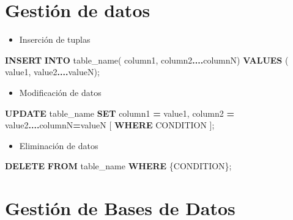 \documentclass[
]{book}
\newenvironment{Shaded}{\begin{snugshade}}{\end{snugshade}}
\newcommand{\KeywordTok}[1]{\textcolor[rgb]{0.13,0.29,0.53}{\textbf{#1}}}
\newcommand{\NormalTok}[1]{#1}
\newcommand{\OperatorTok}[1]{\textcolor[rgb]{0.81,0.36,0.00}{\textbf{#1}}}
\providecommand{\tightlist}{%
  \setlength{\itemsep}{0pt}\setlength{\parskip}{0pt}}
\begin{document}
\section{Gestión de datos}\label{gestiuxf3n-de-datos}

\begin{itemize}
\tightlist
\item
  Inserción de tuplas
\end{itemize}

\begin{Shaded}
\begin{Highlighting}[]
\KeywordTok{INSERT} \KeywordTok{INTO}\NormalTok{ table\_name( column1, column2}\OperatorTok{....}\NormalTok{columnN)}
\KeywordTok{VALUES}\NormalTok{ ( value1, value2}\OperatorTok{....}\NormalTok{valueN);}
\end{Highlighting}
\end{Shaded}

\begin{itemize}
\tightlist
\item
  Modificación de datos
\end{itemize}

\begin{Shaded}
\begin{Highlighting}[]
\KeywordTok{UPDATE}\NormalTok{ table\_name}
\KeywordTok{SET}\NormalTok{ column1 }\OperatorTok{=}\NormalTok{ value1, column2 }\OperatorTok{=}\NormalTok{ value2}\OperatorTok{....}\NormalTok{columnN}\OperatorTok{=}\NormalTok{valueN}
\NormalTok{[ }\KeywordTok{WHERE}\NormalTok{  CONDITION ];}
\end{Highlighting}
\end{Shaded}

\begin{itemize}
\tightlist
\item
  Eliminación de datos
\end{itemize}

\begin{Shaded}
\begin{Highlighting}[]
\KeywordTok{DELETE} \KeywordTok{FROM}\NormalTok{ table\_name}
\KeywordTok{WHERE}\NormalTok{  \{CONDITION\};}
\end{Highlighting}
\end{Shaded}

\section{Gestión de Bases de Datos}\label{gestiuxf3n-de-bases-de-datos}
\end{document}
